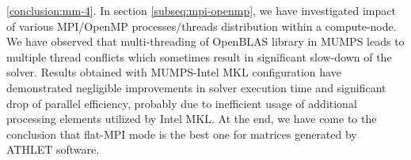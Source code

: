 


\ref{conclusion:mm-4}. In section \ref{subseq:mpi-openmp}, we have investigated impact of various MPI/OpenMP processes/threads distribution within a compute-node. We have observed that multi-threading of OpenBLAS library in MUMPS leads to multiple thread conflicts which sometimes result in significant slow-down of the solver. Results obtained with MUMPS-Intel MKL configuration have demonstrated negligible improvements in solver execution time and significant drop of parallel efficiency, probably due to inefficient usage of additional processing elements utilized by Intel MKL. At the end, we have come to the conclusion that flat-MPI mode is the best one for matrices generated by ATHLET software.\\






